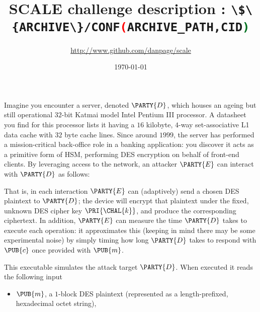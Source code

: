 \documentclass[crop={false},multi={true},tikz={true}]{standalone}
\begin{document}

\ifstandalone
\author{\url{http://www.github.com/danpage/scale}}
\title{\Large SCALE challenge description : \lstinline[language={bash}]|\$\{ARCHIVE\}/CONF(ARCHIVE_PATH,CID)|}
\date{\today}

\maketitle
\fi



Imagine you encounter a server, denoted $\PARTY{D}$, 
which houses an ageing but still operational $32$-bit Katmai model Intel 
Pentium III processor.  
A datasheet you find for this processor lists it having a $16$ kilobyte, 
$4$-way set-associative L1 data cache with $32$ byte cache lines.  Since
around $1999$, the server has performed a mission-critical back-office 
role in a banking application: you discover it acts as a primitive form 
of HSM, performing DES encryption on behalf of front-end clients.
By leveraging access to the network, 
an attacker $\PARTY{E}$ can interact with $\PARTY{D}$ as follows:

\begin{center}

\end{center}

\noindent
That is, in each interaction $\PARTY{E}$ can (adaptively) send 
a chosen DES  plaintext
to $\PARTY{D}$; the device will
encrypt that  plaintext under the fixed, unknown DES cipher key $\PRI{\CHAL{k}}$,
and produce 
the corresponding ciphertext.
In addition, $\PARTY{E}$ can measure the time $\PARTY{D}$ takes to execute 
each operation: it approximates this 
(keeping in mind there may be some experimental noise) 
by simply timing how long $\PARTY{D}$ takes to respond with $\PUB{c}$ once 
provided with $\PUB{m}$.



This executable simulates the attack target $\PARTY{D}$.  When executed it 
reads the following input

\begin{itemize}
\item $\PUB{m}$, 
      a  ${1}$-block DES plaintext 
      (represented as a  length-prefixed, hexadecimal octet   string), 
\end{itemize}
\end{document}
